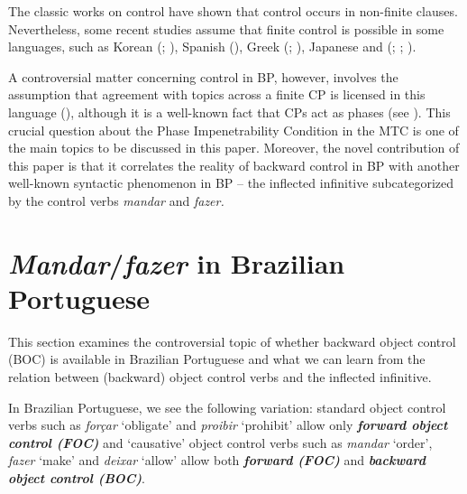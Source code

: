 \documentclass[output=paper]{langsci/langscibook}
\begin{document}
\noindent The classic works on control have shown that control occurs in non-finite clauses. Nevertheless, some recent studies assume that finite control is possible in some languages, such as Korean (\citealt{Yang1985}; \citealt{Borer1989}), Spanish (\citealt{Suñer1988}), Greek (\citealt{Terzi1992,Modesto2000a,Modesto2000b}; \citealt{Alexiadou2010,Alexiadou2011}), Japanese \citep{Uchibori2000} and (\citealt{Farrell1995}; \citealt{Rodrigues2004}; \citealt{Boeckx2006}).

A controversial matter concerning control in BP, however, involves the assumption that agreement with topics across a finite CP is licensed in this language (\citealt{Martins2005}), although it is a well-known fact that CPs act as phases (see \citealt{Chomsky2000}). This crucial question about the Phase Impenetrability Condition in the MTC is one of the main topics to be discussed in this paper. Moreover, the novel contribution of this paper is that it correlates the reality of backward control in BP with another well-known syntactic phenomenon in BP – the inflected infinitive subcategorized by the control verbs \textit{mandar} and \textit{fazer.}


\section{\textit{Mandar}/\textit{fazer} in Brazilian Portuguese}%

This section examines the controversial topic of whether backward object control (BOC) is available in Brazilian Portuguese and what we can learn from the relation between (backward) object control verbs and the inflected infinitive.

In Brazilian Portuguese, we see the following variation: standard object control verbs such as \textit{forçar} ‘obligate’ and \textit{proibir} ‘prohibit’ allow only \textbf{\textit{forw}}\textbf{\textit{ard object control (FOC)}}  and ‘causative’ object control verbs such as \textit{mandar} ‘order’, \textit{fazer} ‘make’ and \textit{deixar} ‘allow’ allow both \textbf{\textit{forward (FOC)}} and \textbf{\textit{backward object control (BOC)}}.  
\end{document}
